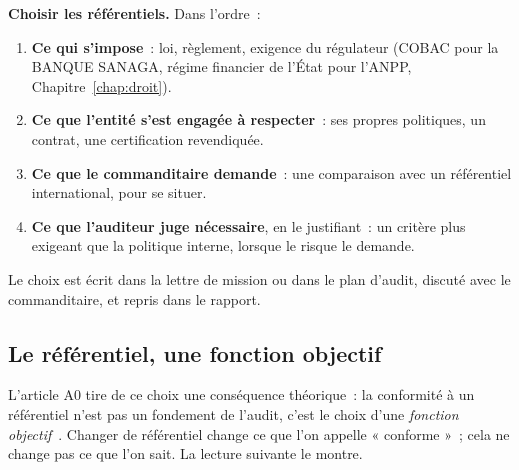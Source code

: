 \begin{boxprocedure}
\textbf{Choisir les référentiels.} Dans l'ordre~:
\begin{enumerate}
    \item \textbf{Ce qui s'impose}~: loi, règlement, exigence du régulateur
          (COBAC pour la BANQUE SANAGA, régime financier de l'État pour
          l'ANPP, Chapitre~\ref{chap:droit}).
    \item \textbf{Ce que l'entité s'est engagée à respecter}~: ses propres
          politiques, un contrat, une certification revendiquée.
    \item \textbf{Ce que le commanditaire demande}~: une comparaison avec un
          référentiel international, pour se situer.
    \item \textbf{Ce que l'auditeur juge nécessaire}, en le justifiant~:
          un critère plus exigeant que la politique interne, lorsque le
          risque le demande.
\end{enumerate}
Le choix est écrit dans la lettre de mission ou dans le plan d'audit,
discuté avec le commanditaire, et repris dans le rapport.
\end{boxprocedure}

\subsection{Le référentiel, une fonction objectif}

L'article A0 tire de ce choix une conséquence théorique~: la conformité à
un référentiel n'est pas un fondement de l'audit, c'est le choix d'une
\emph{fonction objectif}~\cite{minka2026auditologie}. Changer de référentiel
change ce que l'on appelle « conforme »~; cela ne change pas ce que l'on
sait. La lecture suivante le montre.

